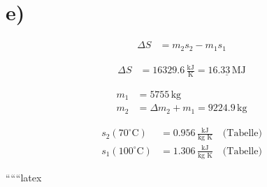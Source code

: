 \section*{e)}
\begin{align*}
\Delta S &= m_2 s_2 - m_1 s_1
\end{align*}

\begin{align*}
\Delta S &= 16329.6 \, \frac{\text{kJ}}{\text{K}} = \underline{16.33 \, \text{MJ}}
\end{align*}

\begin{align*}
m_1 &= 5755 \, \text{kg} \\
m_2 &= \Delta m_2 + m_1 = 9224.9 \, \text{kg}
\end{align*}

\begin{align*}
s_2 (70^\circ \text{C}) &= 0.956 \, \frac{\text{kJ}}{\text{kg K}} \quad \text{(Tabelle)} \\
s_1 (100^\circ \text{C}) &= 1.306 \, \frac{\text{kJ}}{\text{kg K}} \quad \text{(Tabelle)}
\end{align*}

``````latex


